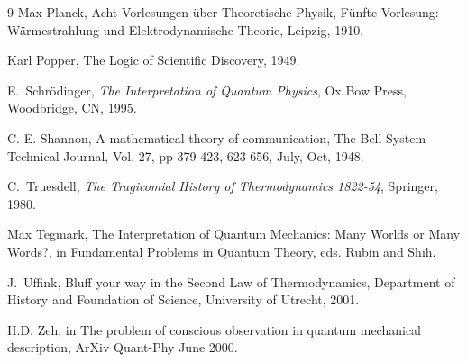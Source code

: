 \begin{thebibliography}{9}
Max Planck,  Acht Vorlesungen \"uber Theoretische Physik, F\"unfte Vorlesung:
W\"armestrahlung und Elektrodynamische Theorie, Leipzig, 1910.






 






 Karl Popper, The Logic of Scientific Discovery, 1949.
 
 E.~Schr\"odinger, 
\emph{The Interpretation of Quantum Physics}, 
Ox Bow Press, Woodbridge, CN, 1995.

 C. E. Shannon, A mathematical theory of communication,
The Bell System Technical Journal, Vol. 27, pp 379-423, 623-656, July, Oct,
1948.

 C.~Truesdell, \emph{The Tragicomial History of 
Thermodynamics
1822-54}, Springer, 1980.

 Max Tegmark,
The Interpretation of Quantum Mechanics: Many Worlds or Many Words?,
in Fundamental Problems in Quantum Theory, eds. Rubin and Shih.

 J.~Uffink, Bluff your way in the Second Law of Thermodynamics,
Department of History and Foundation of Science, University of Utrecht, 2001.

 H.D. Zeh, in The problem
of conscious observation in quantum mechanical description,
ArXiv Quant-Phy June 2000.  









 







\end{thebibliography}
